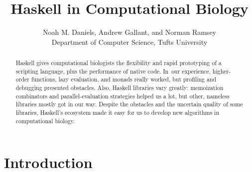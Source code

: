 \documentclass[]{jfp1}
\title{Haskell in Computational Biology}
\author[N. M. Daniels, A. Gallant, and N. Ramsey]
        {Noah M. Daniels, Andrew Gallant, and Norman Ramsey \\
           {Department of Computer Science, Tufts University}\\
           {\email{{\rmfamily\{}ndaniels, agallant, nr{\rmfamily\}}@cs.tufts.edu}}}
\begin{document}
\overfullrule=10pt


\iftimestamp
\fi


\maketitle

%
%
%
\begin{abstract}
Haskell gives computational biologists
the flexibility and rapid prototyping of a scripting
language, plus the performance of native code.
In~our experience, higher-order functions, lazy evaluation, and
monads really worked, but
profiling and debugging presented obstacles.
Also, Haskell libraries vary greatly:
memoization combinators and parallel-evaluation
strategies helped us a lot,
but other, nameless libraries mostly got in our way.
Despite the obstacles and the uncertain quality of some libraries,
Haskell's ecosystem
made it easy for us to develop new algorithms in computational
biology.
\end{abstract}


\section{Introduction}
\end{document}
